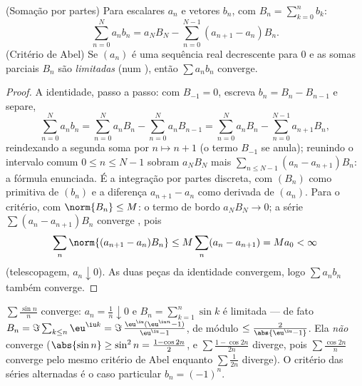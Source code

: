 \begin{theorem}\label{thm:b2:series:abel}
(Somação por partes) Para escalares $a_n$ e vetores $b_n$, com $B_n
= \sum_{k=0}^{n} b_k$:
\[
\sum_{n=0}^{N} a_n b_n
= a_N B_N - \sum_{n=0}^{N-1} (a_{n+1} - a_n) B_n .
\]
(Critério de Abel) Se $(a_n)$ é uma sequência real decrescente para $0$ e
as somas parciais $B_n$ são \emph{limitadas} (num ), então
$\sum a_n b_n$ converge.
\end{theorem}

\begin{proof}
A identidade, passo a passo: com $B_{-1} = 0$, escreva $b_n = B_n -
B_{n-1}$ e separe,
\[
\sum_{n=0}^{N} a_nb_n
= \sum_{n=0}^{N} a_nB_n - \sum_{n=0}^{N} a_nB_{n-1}
= \sum_{n=0}^{N} a_nB_n - \sum_{n=0}^{N-1} a_{n+1}B_{n} ,
\]
reindexando a segunda soma por $n \mapsto n + 1$ (o termo $B_{-1}$
se anula); reunindo o intervalo comum $0 \leq n \leq N-1$
sobram $a_NB_N$ mais $\sum_{n\leq N-1}(a_n - a_{n+1})B_n$: a
fórmula enunciada. É a integração por partes discreta, com
$(B_n)$ como primitiva de $(b_n)$ e a diferença $a_{n+1}
- a_n$ como derivada de $(a_n)$. Para o critério, com $\norm{B_n}
\leq M$: o
termo de bordo $a_N B_N \to 0$; a série $\sum (a_n -
a_{n+1})B_n$ converge , pois
\[
\sum_n \norm{(a_{n+1} - a_n)B_n} \leq M \sum_n (a_n - a_{n+1})
= M a_0 < \infty
\]
(telescopagem, $a_n \downarrow 0$). As duas peças da identidade
convergem, logo $\sum a_n b_n$ também converge.
\end{proof}

\begin{example}\label{ex:b2:series:sinn}
$\sum \frac{\sin n}{n}$ converge: $a_n = \frac1n \downarrow 0$ e
$B_n = \sum_{k=1}^{n} \sin k$ é limitada --- de fato $B_n =
\Im\sum_{k \leq n} \eu^{\iu k} = \Im\,\frac{\eu^{\iu}(\eu^{\iu n} -
1)}{\eu^{\iu} - 1}$, de módulo $\leq \frac{2}{\abs{\eu^{\iu} - 1}}$.
Ela \emph{não} converge  ($\abs{\sin n} \geq \sin^2 n
= \frac{1 - \cos 2n}{2}$, e $\sum \frac{1 - \cos 2n}{2n}$ diverge,
pois $\sum \frac{\cos 2n}{n}$ converge pelo mesmo critério de Abel enquanto
$\sum \frac{1}{2n}$ diverge). O critério das séries alternadas é o
caso particular $b_n = (-1)^n$.
\end{example}


